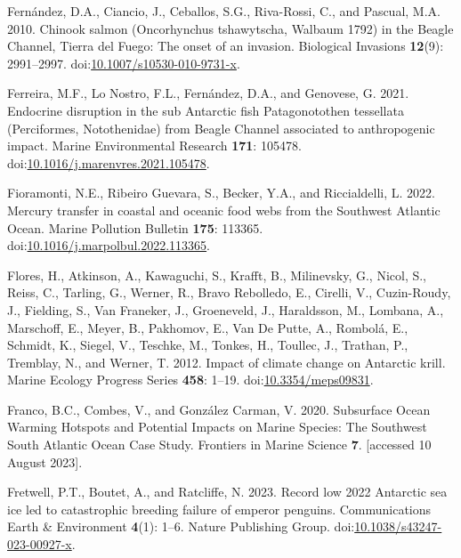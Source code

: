 \documentclass[
]{article}
\newlength{\cslhangindent}
\newenvironment{CSLReferences}[2] %
 {\begin{list}{}{%
  \setlength{\itemindent}{0pt}
  \setlength{\leftmargin}{0pt}
  \setlength{\parsep}{0pt}
  \ifodd #1
   \setlength{\leftmargin}{\cslhangindent}
   \setlength{\itemindent}{-1\cslhangindent}
  \fi
  \setlength{\itemsep}{#2\baselineskip}}}
 {\end{list}}
\begin{document}
\begin{CSLReferences}{1}{0}
Fernández, D.A., Ciancio, J., Ceballos, S.G., Riva-Rossi, C., and
Pascual, M.A. 2010. Chinook salmon ({Oncorhynchus} tshawytscha,
{Walbaum} 1792) in the {Beagle Channel}, {Tierra} del {Fuego}: The onset
of an invasion. Biological Invasions \textbf{12}(9): 2991--2997.
doi:\href{https://doi.org/10.1007/s10530-010-9731-x}{10.1007/s10530-010-9731-x}.

Ferreira, M.F., Lo Nostro, F.L., Fernández, D.A., and Genovese, G. 2021.
Endocrine disruption in the sub {Antarctic} fish {Patagonotothen}
tessellata ({Perciformes}, {Notothenidae}) from {Beagle Channel}
associated to anthropogenic impact. Marine Environmental Research
\textbf{171}: 105478.
doi:\href{https://doi.org/10.1016/j.marenvres.2021.105478}{10.1016/j.marenvres.2021.105478}.

Fioramonti, N.E., Ribeiro Guevara, S., Becker, Y.A., and Riccialdelli,
L. 2022. Mercury transfer in coastal and oceanic food webs from the
{Southwest Atlantic Ocean}. Marine Pollution Bulletin \textbf{175}:
113365.
doi:\href{https://doi.org/10.1016/j.marpolbul.2022.113365}{10.1016/j.marpolbul.2022.113365}.

Flores, H., Atkinson, A., Kawaguchi, S., Krafft, B., Milinevsky, G.,
Nicol, S., Reiss, C., Tarling, G., Werner, R., Bravo Rebolledo, E.,
Cirelli, V., Cuzin-Roudy, J., Fielding, S., Van Franeker, J.,
Groeneveld, J., Haraldsson, M., Lombana, A., Marschoff, E., Meyer, B.,
Pakhomov, E., Van De Putte, A., Rombolá, E., Schmidt, K., Siegel, V.,
Teschke, M., Tonkes, H., Toullec, J., Trathan, P., Tremblay, N., and
Werner, T. 2012. Impact of climate change on {Antarctic} krill. Marine
Ecology Progress Series \textbf{458}: 1--19.
doi:\href{https://doi.org/10.3354/meps09831}{10.3354/meps09831}.

Franco, B.C., Combes, V., and González Carman, V. 2020. Subsurface
{Ocean Warming Hotspots} and {Potential Impacts} on {Marine Species}:
{The Southwest South Atlantic Ocean Case Study}. Frontiers in Marine
Science \textbf{7}. {[}accessed 10 August 2023{]}.

Fretwell, P.T., Boutet, A., and Ratcliffe, N. 2023. Record low 2022
{Antarctic} sea ice led to catastrophic breeding failure of emperor
penguins. Communications Earth \& Environment \textbf{4}(1): 1--6.
Nature Publishing Group.
doi:\href{https://doi.org/10.1038/s43247-023-00927-x}{10.1038/s43247-023-00927-x}.


\end{CSLReferences}
\end{document}
